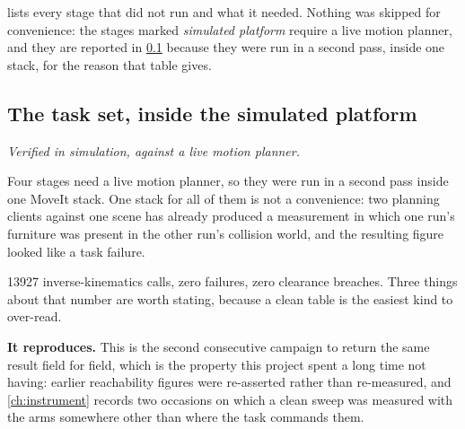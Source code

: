  lists every stage that did not run and what it needed.
Nothing was skipped for convenience: the stages marked \emph{simulated
platform} require a live motion planner, and they are reported in
\cref{sec:sim-tasks} because they were run in a second pass, inside one
stack, for the reason that table gives.

\subsection{The task set, inside the simulated platform}
\label{sec:sim-tasks}

\emph{Verified in simulation, against a live motion planner.}

Four stages need a live motion planner, so they were run in a second pass
inside one MoveIt stack. One stack for all of them is not a convenience: two
planning clients against one scene has already produced a measurement in
which one run's furniture was present in the other run's collision world, and
the resulting figure looked like a task failure.

\begin{table}[htbp]
  \centering
  \small
  \caption[The task set inside the simulated platform]{Every commanded
  coordinate of the task set, solved against a live motion planner. Paths are
  densified to \SI{20}{\milli\metre} and each pose is solved $N$ times,
  because the solver restarts randomly and a pose that solves once has not
  been shown to be reachable. \emph{Floor breaches} counts poses in which any
  moving link came within \SI{150}{\milli\metre} of the wearer, measured
  geometrically rather than by asking the planner whether the pose is valid
  --- the semantic collision description excludes the forty-four proximal
  pairs a shoulder mount actually threatens.}
  \label{tab:sim-tasks}
  
\end{table}

\num{13927} inverse-kinematics calls, zero failures, zero clearance breaches.
Three things about that number are worth stating, because a clean table is
the easiest kind to over-read.

\textbf{It reproduces.} This is the second consecutive campaign to return the
same result field for field, which is the property this project spent a long
time not having: earlier reachability figures were re-asserted rather than
re-measured, and \cref{ch:instrument} records two occasions on which a clean
sweep was measured with the arms somewhere other than where the task
commands them.

